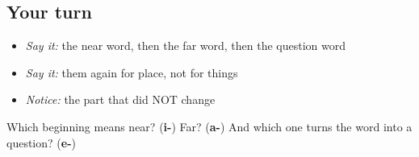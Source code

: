\subsection*{Your turn}
\begin{itemize}
\raggedright
  \item \emph{Say it:} the near word, then the far word, then the question word
  \item \emph{Say it:} them again for place, not for things
  \item \emph{Notice:} the part that did NOT change
\end{itemize}

\begin{tcolorbox}[breakable,colback=teal!4,colframe=teal!35!black,title={Before you move on}]
Which beginning means near? (\textbf{i-}) Far? (\textbf{a-}) And which one turns the word into a question? (\textbf{e-})
\end{tcolorbox}
